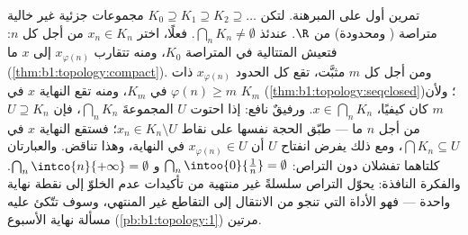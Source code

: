 \begin{example}\label{ex:b1:topology:nested}
تمرين أول على المبرهنة. لتكن $K_0 \supseteq K_1 \supseteq
K_2 \supseteq \dots$ مجموعات جزئية غير خالية متراصة ( ومحدودة)
من $\R$. عندئذ $\bigcap_n K_n \neq \emptyset$. فعلًا، اختر $x_n
\in K_n$ من أجل كل $n$: فتعيش المتتالية في المتراصة $K_0$،
ومنه تتقارب  $x_{\varphi(n)}$ إلى $x$ ما
(\cref{thm:b1:topology:compact}). ومن أجل كل $m$ مثبَّت، تقع كل الحدود
$x_{\varphi(n)}$ ذات $\varphi(n) \geq m$ في 
$K_m$، ومنه تقع النهاية $x$ في $K_m$
(\cref{thm:b1:topology:seqclosed})؛ ولأن $m$ كان كيفيًا، $x \in
\bigcap_n K_n$. ورفيقٌ نافع: إذا احتوت  $U$ المجموعةَ
$\bigcap_n K_n$، فإن $U \supseteq K_n$ من أجل $n$ ما --- طبّق
الحجة نفسها على نقاط $x_n \in K_n \setminus U$؛ فستقع النهاية
$x$ في $\bigcap K_n \subseteq U$، ومع ذلك يفرض انفتاح $U$ أن
$x_{\varphi(n)} \in U$ في النهاية، وهذا تناقض. والعبارتان
كلتاهما تفشلان دون التراص: $\bigcap_n \intoo{0}{\frac
1n} = \emptyset$ و $\bigcap_n \intco{n}{+\infty} = \emptyset$.
والفكرة النافذة: يحوّل التراص سلسلةً غير منتهية من
تأكيدات عدم الخلوّ إلى نقطة نهاية واحدة --- فهو
الأداة التي تنجو من الانتقال إلى التقاطع غير المنتهي، وسوف
تتّكئ عليه مسألة نهاية الأسبوع (\cref{pb:b1:topology:1}) مرتين.
\end{example}

